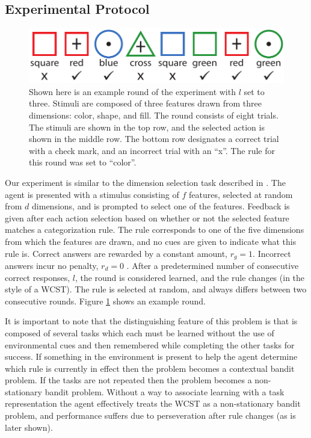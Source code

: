 \documentclass[10pt,letterpaper]{article}
\begin{document}
\subsection{Experimental Protocol}
\label{sec:exp}

\begin{figure}[t!]
    \centering
    \includegraphics[scale=.55]{images/exp_demo.pdf}
    \caption[]{Shown here is an example round of the experiment with $l$ set to three. Stimuli are composed of three features drawn from three dimensions: color, shape, and fill. The round consists of eight trials. The stimuli are shown in the top row, and the selected action is shown in the middle row. The bottom row designates a correct trial with a check mark, and an incorrect trial with an ``x''. The rule for this round was set to ``color''.}
    \label{fig:exp_demo}
\end{figure}

Our experiment is similar to the dimension selection task described in \cite{rougier_prefrontal_2005}. The agent is presented with a stimulus consisting of $f$ features, selected at random from $d$ dimensions, and is prompted to select one of the features. Feedback is given after each action selection based on whether or not the selected feature matches a categorization rule. The rule corresponds to one of the five dimensions from which the features are drawn, and no cues are given to indicate what this rule is. Correct answers are rewarded by a constant amount, $r_g = 1$. Incorrect answers incur no penalty, $r_d = 0$ . After a predetermined number of consecutive correct responses, $l$, the round is considered learned, and the rule changes (in the style of a WCST). The rule is selected at random, and always differs between two consecutive rounds. Figure \ref{fig:exp_demo} shows an example round.

It is important to note that the distinguishing feature of this problem is that is composed of several tasks which each must be learned without the use of environmental cues and then remembered while completing the other tasks for success. If something in the environment is present to help the agent determine which rule is currently in effect then the problem becomes a contextual bandit problem. If the tasks are not repeated then the problem becomes a non-stationary bandit problem. Without a way to associate learning with a task representation the agent effectively treats the WCST as a non-stationary bandit problem, and performance suffers due to perseveration after rule changes (as is later shown). 
\end{document}
